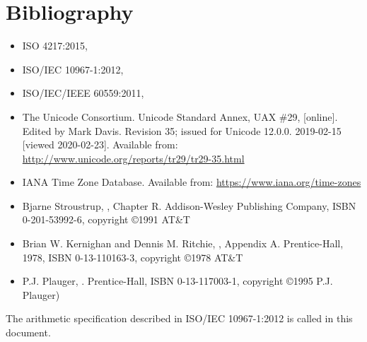 
\chapter{Bibliography}

\begin{itemize}
\renewcommand{\labelitemi}{---}
\item
  ISO 4217:2015,
\item
  ISO/IEC 10967-1:2012,
\item
  ISO/IEC/IEEE 60559:2011, 
\item
  The Unicode Consortium. Unicode Standard Annex, UAX \#29,
   [online].
  Edited by Mark Davis. Revision 35; issued for Unicode 12.0.0. 2019-02-15 [viewed 2020-02-23].
  Available from: \url{http://www.unicode.org/reports/tr29/tr29-35.html}
\item
  IANA Time Zone Database.
  Available from: \url{https://www.iana.org/time-zones}
\item
  Bjarne Stroustrup,
  , Chapter R.
  Addison-Wesley Publishing Company, ISBN 0-201-53992-6, copyright \copyright 1991 AT\&T
\item
  Brian W. Kernighan and Dennis M. Ritchie,
  , Appendix A.
  Prentice-Hall, 1978, ISBN 0-13-110163-3, copyright \copyright 1978 AT\&T
\item
  P.J. Plauger,
  .
  Prentice-Hall, ISBN 0-13-117003-1, copyright \copyright 1995 P.J. Plauger)
\end{itemize}

The arithmetic specification described in ISO/IEC 10967-1:2012 is
called  in this document.

\let\realglossitem\glossitem
\renewcommand{\glossitem}[4]{\hangpara{4em}{1}\realglossitem{#1}{#2}{#3}{#4}}

